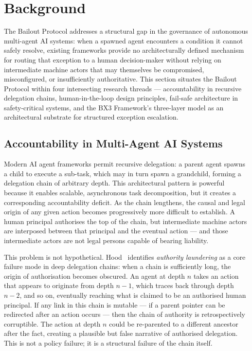 \section{Background}
\label{sec:background}

The Bailout Protocol addresses a structural gap in the governance of autonomous multi-agent AI systems: when a spawned agent encounters a condition it cannot safely resolve, existing frameworks provide no architecturally defined mechanism for routing that exception to a human decision-maker without relying on intermediate machine actors that may themselves be compromised, misconfigured, or insufficiently authoritative. This section situates the Bailout Protocol within four intersecting research threads — accountability in recursive delegation chains, human-in-the-loop design principles, fail-safe architecture in safety-critical systems, and the BX3 Framework's three-layer model as an architectural substrate for structured exception escalation.

\subsection{Accountability in Multi-Agent AI Systems}
\label{sec:accountability}

Modern AI agent frameworks permit recursive delegation: a parent agent spawns a child to execute a sub-task, which may in turn spawn a grandchild, forming a delegation chain of arbitrary depth. This architectural pattern is powerful because it enables scalable, asynchronous task decomposition, but it creates a corresponding accountability deficit. As the chain lengthens, the causal and legal origin of any given action becomes progressively more difficult to establish. A human principal authorises the top of the chain, but intermediate machine actors are interposed between that principal and the eventual action — and those intermediate actors are not legal persons capable of bearing liability.

This problem is not hypothetical. Hood~\cite{hood2025} identifies \emph{authority laundering} as a core failure mode in deep delegation chains: when a chain is sufficiently long, the origin of authorisation becomes obscured. An agent at depth $n$ takes an action that appears to originate from depth $n-1$, which traces back through depth $n-2$, and so on, eventually reaching what is claimed to be an authorised human principal. If any link in this chain is mutable — if a parent pointer can be redirected after an action occurs — then the chain of authority is retrospectively corruptible. The action at depth $n$ could be re-parented to a different ancestor after the fact, creating a plausible but false narrative of authorised delegation. This is not a policy failure; it is a structural failure of the chain itself.

